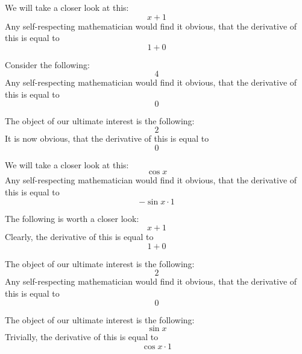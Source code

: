 \documentclass{article}
\begin{document}
We will take a closer look at this:
\begin{equation}
x + 1 
\end{equation}
Any self-respecting mathematician would find it obvious, that the derivative of this is equal to
\begin{equation}
1 + 0 
\end{equation}

Consider the following:
\begin{equation}
4 
\end{equation}
Any self-respecting mathematician would find it obvious, that the derivative of this is equal to
\begin{equation}
0 
\end{equation}

The object of our ultimate interest is the following:
\begin{equation}
2 
\end{equation}
It is now obvious, that the derivative of this is equal to
\begin{equation}
0 
\end{equation}

We will take a closer look at this:
\begin{equation}
\cos x 
\end{equation}
Any self-respecting mathematician would find it obvious, that the derivative of this is equal to
\begin{equation}
-\sin x \cdot 1 
\end{equation}

The following is worth a closer look:
\begin{equation}
x + 1 
\end{equation}
Clearly, the derivative of this is equal to
\begin{equation}
1 + 0 
\end{equation}

The object of our ultimate interest is the following:
\begin{equation}
2 
\end{equation}
Any self-respecting mathematician would find it obvious, that the derivative of this is equal to
\begin{equation}
0 
\end{equation}

The object of our ultimate interest is the following:
\begin{equation}
\sin x 
\end{equation}
Trivially, the derivative of this is equal to
\begin{equation}
\cos x \cdot 1 
\end{equation}
\end{document}
